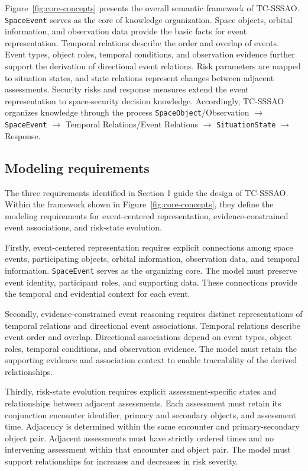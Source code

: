 \documentclass[Royal,sageh,times]{sagej}
\newcommand{\ont}[1]{{\urlstyle{tt}\nolinkurl{#1}}}
\begin{document}
Figure~\ref{fig:core-concepts} presents the overall semantic framework of TC-SSSAO. \ont{SpaceEvent} serves as the core of knowledge organization. Space objects, orbital information, and observation data provide the basic facts for event representation. Temporal relations describe the order and overlap of events. Event types, object roles, temporal conditions, and observation evidence further support the derivation of directional event relations. Risk parameters are mapped to situation states, and state relations represent changes between adjacent assessments. Security risks and response measures extend the event representation to space-security decision knowledge. Accordingly, TC-SSSAO organizes knowledge through the process \ont{SpaceObject}/Observation $\rightarrow$ \ont{SpaceEvent} $\rightarrow$ Temporal Relations/Event Relations $\rightarrow$ \ont{SituationState} $\rightarrow$ Response.

\subsection{Modeling requirements}

The three requirements identified in Section 1 guide the design of TC-SSSAO. Within the framework shown in Figure~\ref{fig:core-concepts}, they define the modeling requirements for event-centered representation, evidence-constrained event associations, and risk-state evolution.

Firstly, event-centered representation requires explicit connections among space events, participating objects, orbital information, observation data, and temporal information. \ont{SpaceEvent} serves as the organizing core. The model must preserve event identity, participant roles, and supporting data. These connections provide the temporal and evidential context for each event.

Secondly, evidence-constrained event reasoning requires distinct representations of temporal relations and directional event associations. Temporal relations describe event order and overlap. Directional associations depend on event types, object roles, temporal conditions, and observation evidence. The model must retain the supporting evidence and association context to enable traceability of the derived relationships.

Thirdly, risk-state evolution requires explicit assessment-specific states and relationships between adjacent assessments. Each assessment must retain its conjunction encounter identifier, primary and secondary objects, and assessment time. Adjacency is determined within the same encounter and primary-secondary object pair. Adjacent assessments must have strictly ordered times and no intervening assessment within that encounter and object pair. The model must support relationships for increases and decreases in risk severity.
\end{document}

